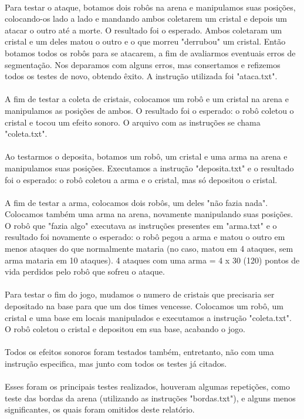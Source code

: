 \documentclass[a4paper]{article}
\begin{document}
\paragraph{}
Para testar o ataque, botamos dois robôs na arena e manipulamos suas posições, colocando-os lado a lado e mandando ambos coletarem um cristal e depois um atacar o outro até a morte. O resultado foi o esperado. Ambos coletaram um cristal e um deles matou o outro e o que morreu "derrubou" um cristal. Então botamos todos os robôs para se atacarem, a fim de avaliarmos eventuais erros de segmentação. Nos deparamos com alguns erros, mas consertamos e refizemos todos os testes de novo, obtendo êxito. A instrução utilizada foi "ataca.txt".
\paragraph{}
A fim de testar a coleta de cristais, colocamos um robô e um cristal na arena e manipulamos as posições de ambos. O resultado foi o esperado: o robô coletou o cristal e tocou um efeito sonoro. O arquivo com as instruções se chama "coleta.txt".
\paragraph{}
Ao testarmos o deposita, botamos um robô, um cristal e uma arma na arena e manipulamos suas posições. Executamos a instrução "deposita.txt" e o resultado foi o esperado: o robô coletou a arma e o cristal, mas só depositou o cristal.
\paragraph{}
A fim de testar a arma, colocamos dois robôs, um deles "não fazia nada". Colocamos também uma arma na arena, novamente manipulando suas posições. O robô que "fazia algo" executava as instruções presentes em "arma.txt" e o resultado foi novamente o esperado: o robô pegou a arma e matou o outro em menos ataques do que normalmente mataria (no caso, matou em 4 ataques, sem arma mataria em 10 ataques). 4 ataques com uma arma = 4 x 30 (120) pontos de vida perdidos pelo robô que sofreu o ataque.
\paragraph{}
Para testar o fim do jogo, mudamos o numero de cristais que precisaria ser depositado na base para que um dos times vencesse. Colocamos um robô, um cristal e uma base em locais manipulados e executamos a instrução "coleta.txt". O robô coletou o cristal e depositou em sua base, acabando o jogo.
\paragraph{}
Todos os efeitos sonoros foram testados também, entretanto, não com uma instrução especifica, mas junto com todos os testes já citados.
\paragraph{}
Esses foram os principais testes realizados, houveram algumas repetições, como teste das bordas da arena (utilizando as instruções "bordas.txt"), e alguns menos significantes, os quais foram omitidos deste relatório.
 
\end{document}

